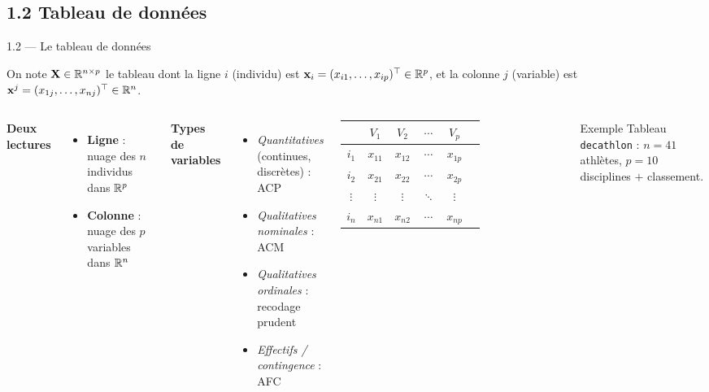 \subsection{1.2 Tableau de données}
\begin{frame}{1.2 — Le tableau de données}
\begin{definition}
On note $\mathbf{X} \in \mathbb{R}^{n \times p}$ le tableau dont la ligne $i$ (individu) est
$\mathbf{x}_i = (x_{i1}, \ldots, x_{ip})^\top \in \mathbb{R}^p$, et la colonne $j$
(variable) est $\mathbf{x}^j = (x_{1j}, \ldots, x_{nj})^\top \in \mathbb{R}^n$.
\end{definition}

\begin{columns}[T]
\textbf{Deux lectures}
\begin{itemize}
  \item \textbf{Ligne} : nuage des $n$ individus dans $\mathbb{R}^p$
  \item \textbf{Colonne} : nuage des $p$ variables dans $\mathbb{R}^n$
\end{itemize}
\vspace{0.2cm}
\textbf{Types de variables}
\begin{itemize}\small
  \item \emph{Quantitatives} (continues, discrètes) : ACP
  \item \emph{Qualitatives nominales} : ACM
  \item \emph{Qualitatives ordinales} : recodage prudent
  \item \emph{Effectifs / contingence} : AFC
\end{itemize}
\centering
\footnotesize
\renewcommand{\arraystretch}{1.1}
\begin{tabular}{c|ccccc}
  & $V_1$ & $V_2$ & $\cdots$ & $V_p$ \\
\hline
$i_1$    & $x_{11}$ & $x_{12}$ & $\cdots$ & $x_{1p}$ \\
$i_2$    & $x_{21}$ & $x_{22}$ & $\cdots$ & $x_{2p}$ \\
$\vdots$ & $\vdots$ & $\vdots$ & $\ddots$ & $\vdots$ \\
$i_n$    & $x_{n1}$ & $x_{n2}$ & $\cdots$ & $x_{np}$ \\
\end{tabular}

\vspace{0.3cm}
\begin{block}{\small Exemple}
\small Tableau \texttt{decathlon} : $n=41$ athlètes,
$p=10$ disciplines $+$ classement.
\end{block}
\end{columns}
\end{frame}

